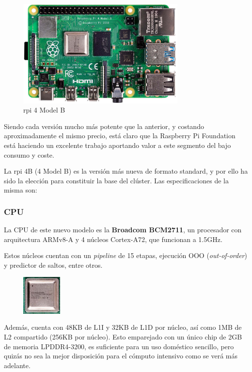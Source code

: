 \begin{figure}[h!]
  \centering
  \includegraphics[width=0.75\textwidth]{img/rpi_parts/rpi_base.jpg}
  \caption{\acrlong{rpi} 4 Model B}
  \label{fig:rpi_base}
\end{figure}

Siendo cada versión mucho más potente que la anterior, y costando aproximadamente el mismo precio, está claro que la Raspberry Pi Foundation está haciendo un excelente trabajo aportando valor a este segmento del bajo consumo y coste.

La \acrlong{rpi} 4B (4 Model B) es la versión más nueva de formato standard, y por ello ha sido la elección para constituir la base del clúster. Las especificaciones de la misma son: \cite{rpi4b_specifications}

\subsubsection{CPU}
La CPU de este nuevo modelo es la \textbf{Broadcom BCM2711}, un procesador con arquitectura ARMv8-A y 4 núcleos Cortex-A72, que funcionan a 1.5GHz.

Estos núcleos cuentan con un \textit{pipeline} de 15 etapas, ejecución OOO (\textit{out-of-order}) y predictor de saltos, entre otros.

\begin{figure}
  \centering
  \includegraphics[width=0.18\textwidth]{img/rpi_parts/rpi_cpu.jpg}
  \label{fig:rpi_cpu}
\end{figure}
Además, cuenta con 48KB de L1I y 32KB de L1D por núcleo, así como 1MB de L2 compartido (256KB por núcleo). Esto emparejado con un único chip de 2GB de memoria LPDDR4-3200, es suficiente para un uso doméstico sencillo, pero quizás no sea la mejor disposición para el cómputo intensivo como se verá más adelante.

